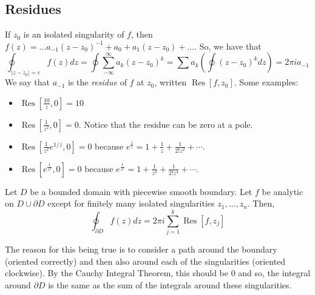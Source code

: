 \documentclass[11pt,leqno,oneside]{amsart}
\newcommand{\Res}{\operatorname{Res}}
\begin{document}
  \subsection*{Residues}
  If $z_0$ is an isolated singularity of $f$, then $f(z) = \ldots
  a_{-1}(z-z_0)^{-1} + a_0 + a_1(z-z_0)+\ldots$. So, we have that \[
    \oint_{|z-z_0| = \epsilon} f(z)dz = \oint \sum_{-\infty}^{\infty}
    a_k(z-z_0)^k = \sum a_k
    \left(
      \oint (z-z_0)^kdz
    \right) = 2\pi i a_{-1}
  \]
  We say that $a_{-1}$ is the \emph{residue} of $f$ at $z_0$, written
  $\Res[f,z_0]$. Some examples:
  \begin{example}
    \begin{itemize}
    \item $\Res[\frac{10}{z},0] = 10$
    \item $\Res[\frac{1}{z^2},0] = 0$. Notice that the residue can be
      zero at a pole.
    \item $\Res[\frac{1}{z^2}e^{1/z},0] = 0$ because $e^{\frac{1}{z}}
      = 1 + \frac{1}{z} + \frac{1}{2!z^2} + \cdots$.
    \item $\Res[e^{\frac{1}{z^2}},0] = 0$ because $e^{\frac{1}{z^2}} =
      1+ \frac{1}{z^2} + \frac{1}{2! z^4} + \cdots$. 
    \end{itemize}
  \end{example}
  \begin{thm}
    Let $D$ be a bounded domain with piecewise smooth boundary. Let
    $f$ be analytic on $D \cup \partial D$ except for finitely many
    isolated singularities $z_1, \ldots, z_n$. Then, \[
      \oint_{\partial D} f(z)dz = 2 \pi i \sum_{j=1}^k \Res[f,z_j]
    \]
  \end{thm}
  The reason for this being true is to consider a path around the
  boundary (oriented correctly) and then also around each of the
  singularities (oriented clockwise). By the
  Cauchy Integral Theorem, this should be 0 and so, the integral
  around $\partial D$ is the same as the sum of the integrals around
  these singularities.
\end{document}
